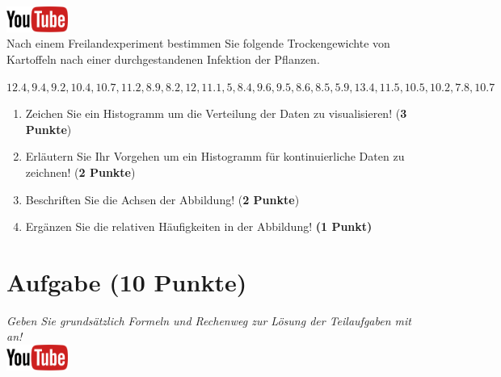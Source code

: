 \documentclass[a4paper, 9pt]{scrartcl}\usepackage[]{graphicx}\usepackage[]{xcolor}
\begin{document}
\hfill\href{https://youtu.be/ORHSPTCdfeY}{\includegraphics[width =
  2cm]{img/youtube}}\\[1Ex]



Nach einem Freilandexperiment bestimmen Sie folgende Trockengewichte von
Kartoffeln nach einer durchgestandenen Infektion der Pflanzen. 

\begin{center}
$12.4, 9.4, 9.2, 10.4, 10.7, 11.2, 8.9, 8.2, 12, 11.1, 5, 8.4, 9.6, 9.5, 8.6, 8.5, 5.9, 13.4, 11.5, 10.5, 10.2, 7.8, 10.7$
\end{center}

\begin{enumerate}
\item Zeichen Sie ein Histogramm um die Verteilung der Daten zu
  visualisieren! (\textbf{3 Punkte})
 \item Erl{\"a}utern Sie Ihr Vorgehen um ein Histogramm f{\"u}r kontinuierliche
  Daten zu zeichnen!  (\textbf{2 Punkte})
\item Beschriften Sie die Achsen der Abbildung! (\textbf{2 Punkte})
\item Erg{\"a}nzen Sie die relativen H{\"a}ufigkeiten in der Abbildung! \textbf{(1
    Punkt)}  
\end{enumerate}

 
\clearpage

\section{Aufgabe \hfill (10 Punkte)}

\textit{Geben Sie grunds{\"a}tzlich Formeln und Rechenweg zur L{\"o}sung der
  Teilaufgaben mit an!} \\[1Ex]

\hfill\href{https://youtu.be/VAqiUdV4WQ0}{\includegraphics[width =
  2cm]{img/youtube}}\\[1Ex]
\end{document}

